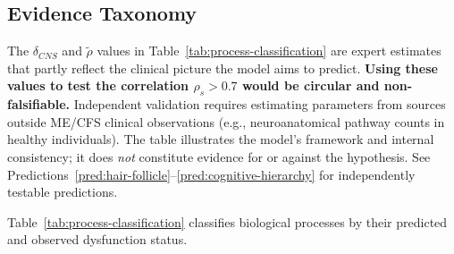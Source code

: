 \subsection{Evidence Taxonomy}

\begin{warning}
The $\delta_{CNS}$ and $\tilde{\rho}$ values in Table~\ref{tab:process-classification} are expert estimates that partly reflect the clinical picture the model aims to predict. \textbf{Using these values to test the correlation $\rho_s > 0.7$ would be circular and non-falsifiable.} Independent validation requires estimating parameters from sources outside ME/CFS clinical observations (e.g., neuroanatomical pathway counts in healthy individuals). The table illustrates the model's framework and internal consistency; it does \emph{not} constitute evidence for or against the hypothesis. See Predictions~\ref{pred:hair-follicle}--\ref{pred:cognitive-hierarchy} for independently testable predictions.
\end{warning}

Table~\ref{tab:process-classification} classifies biological processes by their predicted and observed dysfunction status.

